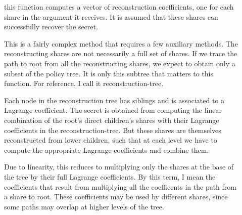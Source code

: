 \documentclass{article}
\begin{document}
\begin{description}
\item[] this function computes a vector of reconstruction coefficients, one for each share in the argument it receives. It is assumed that these shares can successfully recover the secret.

This is a fairly complex method that requires a few auxiliary methods. The reconstructing shares are not necessarily a full set of shares. If we trace the path to root from all the reconstructing shares, we expect to obtain only a subset of the policy tree. It is only this subtree that matters to this function. For reference, I call it reconstruction-tree.

Each node in the reconstruction tree has siblings and is associated to a Lagrange coefficient. The secret is obtained from computing the linear combination of the root's direct children's shares with their Lagrange coefficients in the reconstruction-tree. But these shares are themselves reconstructed from lower children, such that at each level we have to compute the appropriate Lagrange coefficients and combine them.

Due to linearity, this reduces to multiplying only the shares at the base of the tree by their full Lagrange coefficients. By this term, I mean the coefficients that result from multiplying all the coefficents in the path from a share to root. These coefficients may be used by different shares, since some paths may overlap at higher levels of the tree.


\end{description}
\end{document}

